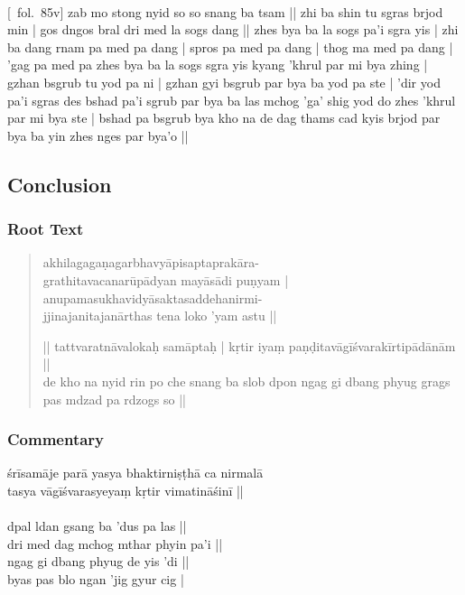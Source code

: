 \documentclass[12pt]{article}
\begin{document}
\textbf{\TVB}\\
{[}\TVB\ fol.\ 85v{]} zab mo stong nyid so so snang ba tsam || zhi ba shin tu sgras brjod min | gos dngos bral dri med la sogs dang || zhes bya ba la sogs pa'i sgra yis | zhi ba dang rnam pa med pa dang | spros pa med pa dang | thog ma med pa dang | 'gag pa med pa zhes bya ba la sogs sgra yis kyang 'khrul par mi bya zhing | gzhan bsgrub tu yod pa ni | gzhan gyi bsgrub par bya ba yod pa ste | 'dir yod pa'i sgras des bshad pa'i sgrub par bya ba las mchog 'ga' shig yod do zhes 'khrul par mi bya ste | bshad pa bsgrub bya kho na de dag thams cad kyis brjod par bya ba yin zhes nges par bya'o || \\

\subsection{Conclusion}
\subsubsection{Root Text}
\begin{quote}
	akhilagagaṇagarbhavyāpisaptaprakāra\footnoteB{
		°saptaprakāra°] \EDD ; °sarvaprakāra° \MS
	}-\\
	grathitavacanarūpādyan mayāsādi puṇyam |\\
	anupamasukhavidyāsaktasaddehanirmi-\\
	jjinajanitajanārthas tena loko 'yam astu ||

	|| tattvaratnāvalokaḥ samāptaḥ | kṛtir iyaṃ paṇḍitavāgīśvarakīrtipādānām ||\\

	de kho na nyid rin po che snang ba slob dpon ngag gi dbang phyug grags pas mdzad pa rdzogs so ||
\end{quote}

\subsubsection{Commentary}
śrīsamāje parā yasya bhaktirniṣṭhā ca nirmalā\\
tasya vāgīśvarasyeyaṃ kṛtir vimatināśinī ||\\

\textbf{\TVA}\\
dpal ldan gsang ba 'dus pa las || \\
dri med dag mchog mthar phyin pa'i || \\
ngag gi dbang phyug de yis 'di || \\
byas pas blo ngan 'jig gyur cig  |\\
\end{document}
